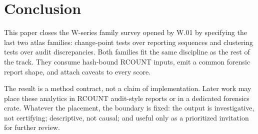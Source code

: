 \section{Conclusion}

This paper closes the W-series family survey opened by W.01 by specifying the
last two atlas families: change-point tests over reporting sequences and
clustering tests over audit discrepancies. Both families fit the same discipline
as the rest of the track. They consume hash-bound RCOUNT inputs, emit a common
forensic report shape, and attach caveats to every score.

The result is a method contract, not a claim of implementation. Later work may
place these analytics in RCOUNT audit-style reports or in a dedicated
forensics crate. Whatever the placement, the boundary is fixed: the output is
investigative, not certifying; descriptive, not causal; and useful only as a
prioritized invitation for further review.
